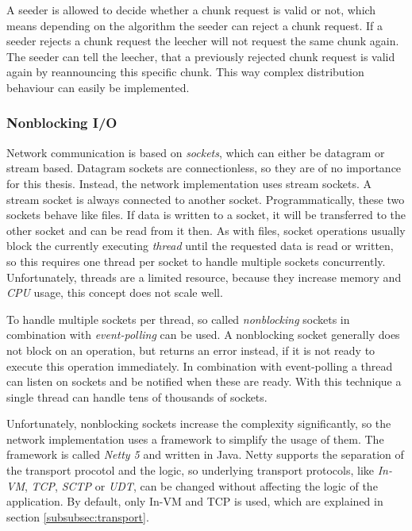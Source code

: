 A seeder is allowed to decide whether a chunk request is valid or not, which means depending on the algorithm the seeder can reject a chunk request. If a seeder rejects a chunk request the leecher will not request the same chunk again. The seeder can tell the leecher, that a previously rejected chunk request is valid again by reannouncing this specific chunk. This way complex distribution behaviour
can easily be implemented.


\subsubsection{Nonblocking I/O}
Network communication is based on \emph{sockets}, which can either be datagram or stream based. Datagram sockets are connectionless, so they are of no importance for this thesis. Instead, the network implementation uses stream sockets. A stream socket is always connected to another socket. Programmatically, these two sockets behave like files. If data is written to a socket, it will be transferred to the other socket and can be read from it then. As with files, socket operations usually block the currently executing \emph{thread} until the requested data is read or written, so this requires one thread per socket to handle multiple sockets concurrently. Unfortunately, threads are a limited resource, because they increase memory and \emph{CPU} usage, this concept does not scale well.

To handle multiple sockets per thread, so called \emph{nonblocking} sockets in combination with \emph{event-polling} can be used. A nonblocking socket generally does not block on an operation, but returns an error instead, if it is not ready to execute this operation immediately. In combination with event-polling a thread can listen on sockets and be notified when these are ready. With this technique a single thread can handle tens of thousands of sockets.

Unfortunately, nonblocking sockets increase the complexity significantly, so the network implementation uses a framework to simplify the usage of them. The framework is called \emph{Netty 5} and written in Java. Netty supports the separation of the transport procotol and the logic, so underlying transport protocols, like \emph{In-VM}, \emph{TCP}, \emph{SCTP} or \emph{UDT}, can be changed without affecting the logic of the application. By default, only In-VM and TCP is used, which are explained in section \ref{subsubsec:transport}.

